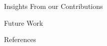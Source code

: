 \documentclass[10pt,xcolor=table]{beamer}
\begin{document}
\begin{frame}{Insights From our Contributions}
%			
%		


\end{frame}





\begin{frame}{Future Work}
%
%
%
%

\end{frame}
	
\begin{frame}[allowframebreaks]{References}

\printbibliography
%

\end{frame}	
	
\end{document}
